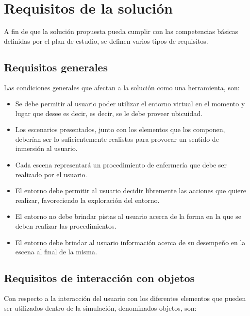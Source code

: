\section{Requisitos de la solución}
\label{sec:requisitos}

A fin de que la solución propuesta pueda cumplir con las competencias básicas
definidas por el plan de estudio, se definen varios tipos de requisitos.

\subsection{Requisitos generales}

Las condiciones generales que afectan a la solución como una herramienta, son:

\begin{itemize}
\item Se debe permitir al usuario poder utilizar el entorno virtual en el
    momento y lugar que desee es decir, es decir, se le debe proveer ubicuidad.

\item Los escenarios presentados, junto con los elementos que los componen,
    deberían ser lo suficientemente realistas para provocar un sentido de
    inmersión al usuario.

\item Cada escena representará un procedimiento de enfermería que debe ser
    realizado por el usuario.

\item El entorno debe permitir al usuario decidir libremente las acciones que
    quiere realizar, favoreciendo la exploración del entorno.

\item El entorno no debe brindar pistas al usuario acerca de la forma en la que
    se deben realizar las procedimientos.

\item El entorno debe brindar al usuario información acerca de su desempeño en
    la escena al final de la misma.

\end{itemize}

\subsection{Requisitos de interacción con objetos}

Con respecto a la interacción del usuario con los diferentes elementos que
pueden ser utilizados dentro de la simulación, denominados objetos, son:

